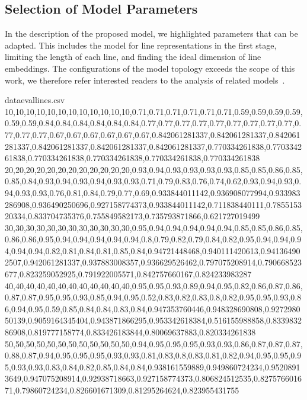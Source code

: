 \documentclass{llncs}
\begin{document}
\subsection{Selection of Model Parameters}
In the description of the proposed model, we highlighted parameters that can be adapted.
This includes the model for line representations in the first stage, limiting the length of each line, and finding the ideal dimension of line embeddings.
The configurations of the model topology exceeds the scope of this work, we therefore refer interested readers to the analysis of related models~\cite{char_nn,lstm_cnn_crf,lstm_crf}.
\begin{filecontents*}{dataevallines.csv}
	10,10,10,10,10,10,10,10,10,10,10,10,0.71,0.71,0.71,0.71,0.71,0.71,0.59,0.59,0.59,0.59,0.59,0.59,0.84,0.84,0.84,0.84,0.84,0.84,0.77,0.77,0.77,0.77,0.77,0.77,0.77,0.77,0.77,0.77,0.77,0.77,0.67,0.67,0.67,0.67,0.67,0.67,0.842061281337,0.842061281337,0.842061281337,0.842061281337,0.842061281337,0.842061281337,0.770334261838,0.770334261838,0.770334261838,0.770334261838,0.770334261838,0.770334261838
	20,20,20,20,20,20,20,20,20,20,20,20,0.93,0.94,0.93,0.93,0.93,0.93,0.85,0.85,0.86,0.85,0.85,0.84,0.93,0.94,0.93,0.94,0.93,0.93,0.71,0.79,0.83,0.76,0.74,0.62,0.93,0.94,0.93,0.94,0.93,0.93,0.76,0.81,0.84,0.79,0.77,0.69,0.933844011142,0.936908077994,0.933983286908,0.936490250696,0.927158774373,0.933844011142,0.711838440111,0.785515320334,0.833704735376,0.755849582173,0.735793871866,0.621727019499
	30,30,30,30,30,30,30,30,30,30,30,30,0.95,0.94,0.94,0.94,0.94,0.94,0.85,0.85,0.86,0.85,0.86,0.86,0.95,0.94,0.94,0.94,0.94,0.94,0.8,0.79,0.82,0.79,0.84,0.82,0.95,0.94,0.94,0.94,0.94,0.94,0.82,0.81,0.84,0.81,0.85,0.84,0.94721448468,0.940111420613,0.941364902507,0.942061281337,0.937883008357,0.936629526462,0.797075208914,0.790668523677,0.823259052925,0.791922005571,0.842757660167,0.824233983287
	40,40,40,40,40,40,40,40,40,40,40,40,0.95,0.95,0.93,0.89,0.94,0.95,0.82,0.86,0.87,0.86,0.87,0.87,0.95,0.95,0.93,0.85,0.94,0.95,0.52,0.83,0.82,0.83,0.8,0.82,0.95,0.95,0.93,0.86,0.94,0.95,0.59,0.85,0.84,0.84,0.83,0.84,0.947353760446,0.948328690808,0.927298050139,0.9059164345404,0.943871866295,0.953342618384,0.516155988858,0.833983286908,0.819777158774,0.833426183844,0.80069637883,0.820334261838
	50,50,50,50,50,50,50,50,50,50,50,50,0.94,0.95,0.95,0.95,0.93,0.93,0.86,0.87,0.87,0.87,0.88,0.87,0.94,0.95,0.95,0.95,0.93,0.93,0.81,0.83,0.8,0.83,0.81,0.82,0.94,0.95,0.95,0.95,0.93,0.93,0.83,0.84,0.82,0.85,0.84,0.84,0.938161559889,0.949860724234,0.95208913649,0.947075208914,0.92938718663,0.927158774373,0.806824512535,0.827576601671,0.79860724234,0.826601671309,0.81295264624,0.823955431755

\end{filecontents*}
\end{document}
